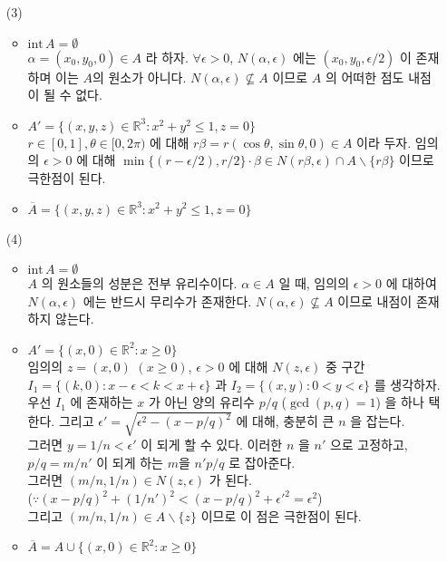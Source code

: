 \documentclass[12pt]{report}
\newcommand{\inte}{\mathrm{int}\,}
\newcommand{\bs}{\backslash}
\newcommand{\R}{\mathbb{R}}
\begin{document}
\begin{enumerate}
\begin{enumerate}
	\item[(3)]
	\begin{itemize}
		\item $\inte A = \emptyset $\\
		$\alpha = (x_0, y_0, 0) \in A$ 라 하자. $\forall \epsilon>0$, $N(\alpha, \epsilon)$ 에는 $(x_0, y_0, \epsilon/2)$ 이 존재하며 이는 $A$의 원소가 아니다. $N(\alpha, \epsilon) \nsubseteq A$ 이므로 $A$ 의 어떠한 점도 내점이 될 수 없다.
		\item $A' = \{(x, y, z)\in \R^3: x^2+y^2 \leq 1, z=0 \}$\\
		$r\in [0, 1], \theta \in [0, 2\pi)$ 에 대해 $r\beta = r(\cos\theta, \sin\theta, 0)\in A$ 이라 두자. 임의의 $\epsilon>0$ 에 대해 $\min\{(r - \epsilon/2), r/2\} \cdot \beta \in N(r\beta, \epsilon)\cap A\bs \{r\beta\}$ 이므로 극한점이 된다.
		\item $\overline{A} = \{(x, y, z)\in \R^3: x^2+y^2 \leq 1, z=0 \}$
	\end{itemize}

	\item[(4)]
	\begin{itemize}
		\item $\inte A = \emptyset$\\
		$A$ 의 원소들의 성분은 전부 유리수이다. $\alpha \in A$ 일 때, 임의의 $\epsilon > 0$ 에 대하여 $N(\alpha, \epsilon)$ 에는 반드시 무리수가 존재한다. $N(\alpha, \epsilon) \nsubseteq A$ 이므로 내점이 존재하지 않는다. 
		\item $A' = \{(x, 0) \in \R^2: x\geq0  \}$\\
		임의의 $z = (x, 0)$ $(x \geq 0)$, $\epsilon > 0$ 에 대해 $N(z, \epsilon)$ 중 구간 $I_1 = \{(k, 0): x - \epsilon < k <x + \epsilon\}$ 과 $I_2 = \{(x, y): 0 < y < \epsilon \}$ 를 생각하자. \\
		우선 $I_1$ 에 존재하는 $x$ 가 아닌 양의 유리수 $p/q$ ($\gcd(p, q) = 1$) 을 하나 택한다. 그리고 $\epsilon' = \sqrt{\epsilon^2 - (x - p/q)^2}$ 에 대해, 충분히 큰 $n$ 을 잡는다. \\
		그러면 $y = 1/n < \epsilon'$ 이 되게 할 수 있다. 이러한 $n$ 을 $n'$ 으로 고정하고, $p/q = m/n'$ 이 되게 하는 $m$을 $n'p/q$ 로 잡아준다. \\
		그러면 $\left(m/n, 1/n\right) \in N(z, \epsilon)$ 가 된다.\\
		($\because (x-p/q)^2 + (1/n')^2 < (x-p/q)^2 + \epsilon'^2 = \epsilon^2$) \\
		그리고 $(m/n, 1/n)\in A\bs \{z\}$ 이므로 이 점은 극한점이 된다.		
		\item $\overline{A} = A\cup \{(x, 0) \in \R^2: x\geq 0\}$		
	\end{itemize}


\end{enumerate}
\end{enumerate}
\end{document}
